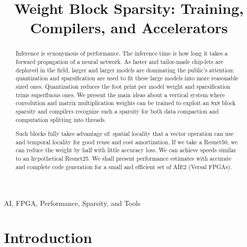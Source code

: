 \documentclass[conference]{IEEEtran}
\begin{document}
\title{Weight Block Sparsity: Training, Compilers, and Accelerators  }

\author{
  \and
  \and
  \and
  \and
  \and
  \and
  \and
}

\maketitle

\begin{abstract}
Inference is synonymous of performance. The inference time is how long
it takes a forward propagation of a neural network.  As faster and
tailor-made chip-lets are deployed in the field, larger and larger
models are dominating the public's attention: quantization and
sparsification are used to fit these large models into more reasonable
sized ones. Quantization reduces the foot print per model weight and
sparsification trims superfluous ones.  We present the main ideas
about a vertical system where convolution and matrix multiplication
weights can be trained to exploit an 8x8 block sparsity and compilers
recognize such a sparsity for both data compaction and computation
splitting into threads.

Such blocks fully takes advantage of: spatial locality that a vector
operation can use and temporal locality for good reuse and cost
amortization. If we take a Resnet50, we can reduce the weight by half
with little accuracy loss. We can achieve speeds similar to an
hypothetical Resnet25. We shall present performance estimates with
accurate and complete code generation for a small and efficient set of
AIE2 (Versal FPGAs).
\end{abstract}


\begin{IEEEkeywords}
 AI, FPGA, Performance, Sparsity, and Tools
\end{IEEEkeywords}

\section{Introduction}
\label{sec:introduction}
\end{document}

